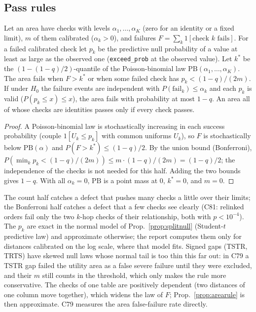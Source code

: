 \subsection{Pass rules}
\begin{proposition}\label{prop:arearule}
Let an area have checks with levels $\alpha_1,\dots,\alpha_K$ (zero for an identity or a fixed limit), $m$ of them calibrated ($\alpha_k>0$), and failures $F=\sum_k 1[\text{check }k\text{ fails}]$. For a failed calibrated check let $p_k$ be the predictive null probability of a value at least as large as the observed one (\texttt{exceed\_prob} at the observed value). Let $k^*$ be the $(1-(1-q)/2)$-quantile of the Poisson-binomial law $\mathrm{PB}(\alpha_1,\dots,\alpha_K)$. The area fails when $F>k^*$ or when some failed check has $p_k<(1-q)/(2m)$. If under $H_0$ the failure events are independent with $P(\text{fail}_k)\le\alpha_k$ and each $p_k$ is valid ($P(p_k\le x)\le x$), the area fails with probability at most $1-q$. An area all of whose checks are identities passes only if every check passes.
\end{proposition}
\begin{proof}
A Poisson-binomial law is stochastically increasing in each success probability (couple $1[U_k\le p_k]$ with common uniforms $U_k$), so $F$ is stochastically below $\mathrm{PB}(\alpha)$ and $P(F>k^*)\le(1-q)/2$. By the union bound (Bonferroni), $P(\min_k p_k<(1-q)/(2m))\le m\cdot(1-q)/(2m)=(1-q)/2$; the independence of the checks is not needed for this half. Adding the two bounds gives $1-q$. With all $\alpha_k=0$, $\mathrm{PB}$ is a point mass at $0$, $k^*=0$, and $m=0$.
\end{proof}
\noindent The count half catches a defect that pushes many checks a little over their limits; the Bonferroni half catches a defect that a few checks see clearly (C81: relinked orders fail only the two $k$-hop checks of their relationship, both with $p<10^{-4}$). The $p_k$ are exact in the normal model of Prop.~\ref{prop:splitnull} (Student-$t$ predictive law) and approximate otherwise; the report computes them only for distances calibrated on the log scale, where that model fits. Signed gaps (TSTR, TRTS) have skewed null laws whose normal tail is too thin this far out: in C79 a TSTR gap failed the utility area as a false severe failure until they were excluded, and their $m$ still counts in the threshold, which only makes the rule more conservative.
\noindent The checks of one table are positively dependent (two distances of one column move together), which widens the law of $F$; Prop.~\ref{prop:arearule} is then approximate. C79 measures the area false-failure rate directly.

